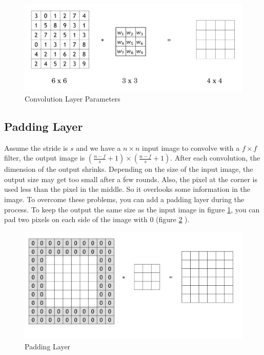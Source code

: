 \documentclass[
  12pt,
]{krantz}
\begin{document}
\begin{figure}

{\centering \includegraphics[width=1\linewidth]{images/convlayer} 

}

\caption{Convolution Layer Parameters}\label{fig:convolutionlayer}
\end{figure}

\hypertarget{padding-layer}{%
\subsection{Padding Layer}\label{padding-layer}}

Assume the stride is \(s\) and we have a \(n \times n\) input image to convolve with a \(f \times f\) filter, the output image is \((\frac{n-f}{s} + 1) \times (\frac{n-f}{s} + 1)\). After each convolution, the dimension of the output shrinks. Depending on the size of the input image, the output size may get too small after a few rounds. Also, the pixel at the corner is used less than the pixel in the middle. So it overlooks some information in the image. To overcome these problems, you can add a padding layer during the process. To keep the output the same size as the input image in figure \ref{fig:convolutionlayer}, you can pad two pixels on each side of the image with 0 (figure \ref{fig:padding} ).

\begin{figure}

{\centering \includegraphics[width=1\linewidth]{images/padding} 

}

\caption{Padding Layer}\label{fig:padding}
\end{figure}
\end{document}
